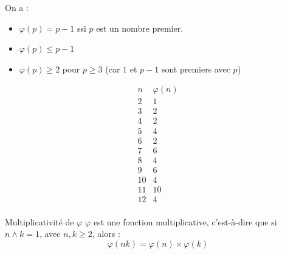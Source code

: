 \begin{remarque}
    On a : 
    \begin{itemize}
        \item $\varphi(p) = p - 1$ ssi $p$ est un nombre premier.
        \item $\varphi(p) \leqslant p - 1$
        \item $\varphi(p) \geqslant 2$ pour $p \geqslant 3$ (car $1$ et $p - 1$ sont premiers avec $p$)
    \end{itemize}
\end{remarque}

\[
    \begin{array}{c|c}
        n & \varphi(n) \\
        \hline
        2 & 1 \\
        3 & 2 \\
        4 & 2 \\
        5 & 4 \\
        6 & 2 \\
        7 & 6 \\
        8 & 4 \\
        9 & 6 \\
        10 & 4 \\
        11 & 10 \\
        12 & 4 \\
    \end{array}
\]

\begin{theoreme}{Multiplicativité de $\varphi$}{}
    $\varphi$ est une fonction multiplicative, c'est-à-dire que 
    si $n \wedge k = 1$, avec $n, k \geqslant 2$, alors :
    \[\varphi(nk) = \varphi(n) \times \varphi(k)\]
\end{theoreme}

